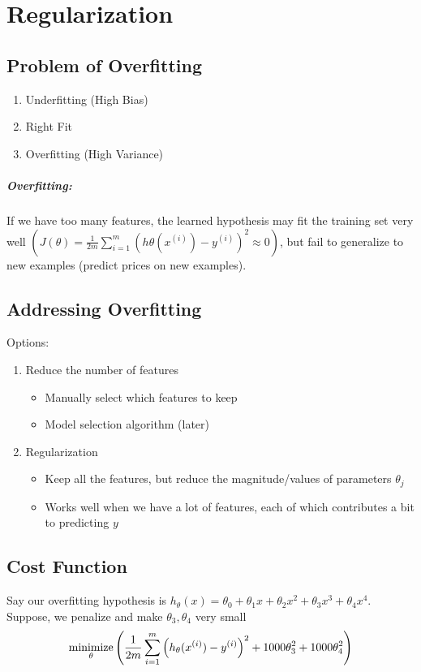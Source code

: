 \chapter{Regularization}
\section{Problem of Overfitting}
\begin{enumerate}
    \item Underfitting (High Bias)
    \item Right Fit
    \item Overfitting (High Variance)
\end{enumerate}
\paragraph{Overfitting:} If we have too many features, the learned hypothesis may fit
the training set very well
$\left(J(\theta) = \frac{1}{2m}\sum_{i=1}^m(h\theta(x^{(i)}) - y^{(i)})^2 \approx 0\right)$,
but fail to generalize to new examples (predict prices on new examples).

\section{Addressing Overfitting}
Options:
\begin{enumerate}
    \item Reduce the number of features
          \begin{itemize}
              \item Manually select which features to keep
              \item Model selection algorithm (later)
          \end{itemize}
    \item Regularization
          \begin{itemize}
              \item Keep all the features, but reduce the magnitude/values of parameters
                    $\theta_j$
              \item Works well when we have a lot of features, each of which contributes
                    a bit to predicting $y$
          \end{itemize}
\end{enumerate}

\section{Cost Function}
Say our overfitting hypothesis is
$h_\theta(x) = \theta_0 + \theta_1x + \theta_2x^2 + \theta_3x^3 + \theta_4x^4$.
Suppose, we penalize and make $\theta_3, \theta_4$ very small
\begin{equation*}
    \operatorname*{minimize}_\theta\left(
    \frac{1}{2m}\sum_{i=1}^m\left(
        h_\theta(x^{(i)}) - y^{(i)}
        \right)^2 + 1000\theta_3^2 + 1000\theta_4^2
    \right)
\end{equation*}

